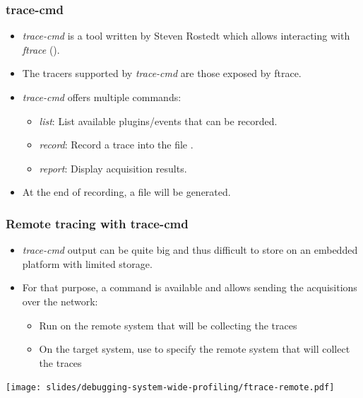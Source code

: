 \begin{frame}
  \frametitle{trace-cmd}
  \begin{itemize}
    \item {\em trace-cmd} is a tool written by Steven Rostedt which allows
          interacting with {\em ftrace} ().
    \item The tracers supported by {\em trace-cmd} are those exposed by ftrace.
    \item {\em trace-cmd} offers multiple commands:
    \begin{itemize}
      \item {\em list}: List available plugins/events that can be recorded.
      \item {\em record}: Record a trace into the file .
      \item {\em report}: Display  acquisition results.
    \end{itemize}
    \item At the end of recording, a  file will be generated.
  \end{itemize}
\end{frame}

\begin{frame}
  \frametitle{Remote tracing with trace-cmd}
  \begin{itemize}
    \item {\em trace-cmd} output can be quite big and thus difficult to
          store on an embedded platform with limited storage.
    \item For that purpose, a  command is available and allows sending
          the acquisitions over the network:
    \begin{itemize}
      \item Run  on the remote system that will
            be collecting the traces
      \item On the target system, use 
            to specify the remote system that will collect the traces
    \end{itemize}
  \end{itemize}
  \center\texttt{[image: slides/debugging-system-wide-profiling/ftrace-remote.pdf]}
\end{frame}

